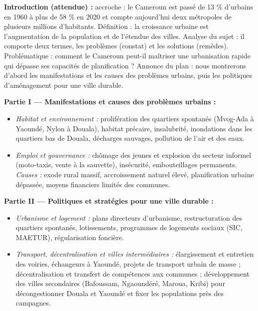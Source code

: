 \documentclass[11pt]{article}
\begin{document}
\begin{corrige}
\textbf{Introduction (attendue) :} accroche : le Cameroun est passé de 13 \% d'urbains en 1960 à plus de 58 \% en 2020 et compte aujourd'hui deux métropoles de plusieurs millions d'habitants. Définition : la croissance urbaine est l'augmentation de la population et de l'étendue des villes. Analyse du sujet : il comporte deux termes, les problèmes (constat) et les solutions (remèdes). Problématique : comment le Cameroun peut-il maîtriser une urbanisation rapide qui dépasse ses capacités de planification ? Annonce du plan : nous montrerons d'abord les manifestations et les causes des problèmes urbains, puis les politiques d'aménagement pour une ville durable.

\textbf{Partie I --- Manifestations et causes des problèmes urbains :}
\begin{itemize}
\item \emph{Habitat et environnement :} prolifération des quartiers spontanés (Mvog-Ada à Yaoundé, Nylon à Douala), habitat précaire, insalubrité, inondations dans les quartiers bas de Douala, décharges sauvages, pollution de l'air et des eaux.
\item \emph{Emploi et gouvernance :} chômage des jeunes et explosion du secteur informel (moto-taxis, vente à la sauvette), insécurité, embouteillages permanents. \emph{Causes :} exode rural massif, accroissement naturel élevé, planification urbaine dépassée, moyens financiers limités des communes.
\end{itemize}

\textbf{Partie II --- Politiques et stratégies pour une ville durable :}
\begin{itemize}
\item \emph{Urbanisme et logement :} plans directeurs d'urbanisme, restructuration des quartiers spontanés, lotissements, programmes de logements sociaux (SIC, MAETUR), régularisation foncière.
\item \emph{Transport, décentralisation et villes intermédiaires :} élargissement et entretien des voiries, échangeurs à Yaoundé, projets de transport urbain de masse ; décentralisation et transfert de compétences aux communes ; développement des villes secondaires (Bafoussam, Ngaoundéré, Maroua, Kribi) pour décongestionner Douala et Yaoundé et fixer les populations près des campagnes.
\end{itemize}


\end{corrige}
\end{document}

